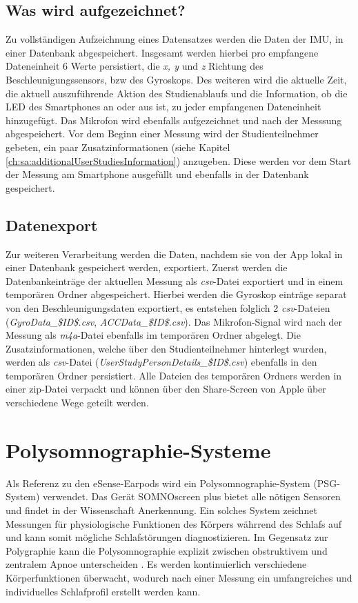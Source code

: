 \subsection{Was wird aufgezeichnet?}
\label{ch:sa:ep:what_to_record}
Zu vollständigen Aufzeichnung eines Datensatzes werden die Daten der IMU, in einer Datenbank abgespeichert.
Insgesamt werden hierbei pro empfangene Dateneinheit 6 Werte persistiert, die \textit{x, y} und \textit{z} Richtung des Beschleunigungssensors, bzw des Gyroskops. 
Des weiteren wird die aktuelle Zeit, die aktuell auszuführende Aktion des Studienablaufs und die Information, ob die LED des Smartphones an oder aus ist, zu jeder empfangenen Dateneinheit hinzugefügt.
Das Mikrofon wird ebenfalls aufgezeichnet und nach der Messsung abgespeichert.
Vor dem Beginn einer Messung wird der Studienteilnehmer gebeten, ein paar Zusatzinformationen (siehe Kapitel \ref{ch:sa:additionalUserStudiesInformation}) anzugeben.
Diese werden vor dem Start der Messung am Smartphone ausgefüllt und ebenfalls in der Datenbank gespeichert.

\subsection{Datenexport}
\label{ch:sa:ep:export}
Zur weiteren Verarbeitung werden die Daten, nachdem sie von der App lokal in einer Datenbank gespeichert werden, exportiert. 
Zuerst werden die Datenbankeinträge der aktuellen Messung als \textit{csv}-Datei exportiert und in einem temporären Ordner abgespeichert.
Hierbei werden die Gyroskop einträge separat von den Beschleunigungsdaten exportiert, es entstehen folglich 2 \textit{csv}-Dateien (\glqq \textit{GyroData\_\$ID\$.csv}\grqq, \glqq \textit{ACCData\_\$ID\$.csv}\grqq).
Das Mikrofon-Signal wird nach der Messung als \textit{m4a}-Datei ebenfalls im temporären Ordner abgelegt.
Die Zusatzinformationen, welche über den Studienteilnehmer hinterlegt wurden, werden als \textit{csv}-Datei (\glqq \textit{UserStudyPersonDetails\_\$ID\$.csv}\grqq) ebenfalls in den temporären Ordner persistiert.
Alle Dateien des temporären Ordners werden in einer zip-Datei verpackt und können über den Share-Screen von Apple über verschiedene Wege geteilt werden.

\section{Polysomnographie-Systeme}
\label{ch:sa:psg}
Als Referenz zu den eSense-Earpods wird ein Polysomnographie-System (PSG-System) verwendet. 
Das Gerät SOMNOscreen{\texttrademark} plus bietet alle nötigen Sensoren und findet in der Wissenschaft Anerkennung. 
Ein solches System zeichnet Messungen für physiologische Funktionen des Körpers währrend des Schlafs auf und kann somit mögliche Schlafstörungen diagnostizieren.
Im Gegensatz zur Polygraphie kann die Polysomnographie explizit zwischen obstruktivem und zentralem Apnoe unterscheiden \cite{schlafmedizin_1x1}.
Es werden kontinuierlich verschiedene Körperfunktionen überwacht, wodurch nach einer Messung ein umfangreiches und individuelles Schlafprofil erstellt werden kann.

